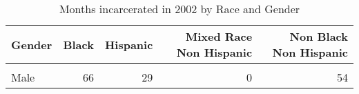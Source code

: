 \begin{table}[H]

\caption{\label{tab:tab:summarystats}Months incarcerated in 2002 by Race and Gender}
\centering
\begin{tabular}[t]{lrrrr}
\toprule
Gender & Black & Hispanic & Mixed Race Non Hispanic & Non Black Non Hispanic\\
\midrule
\cellcolor{gray!6}{Female} & \cellcolor{gray!6}{9} & \cellcolor{gray!6}{6} & \cellcolor{gray!6}{1} & \cellcolor{gray!6}{13}\\
Male & 66 & 29 & 0 & 54\\
\bottomrule
\end{tabular}
\end{table}
